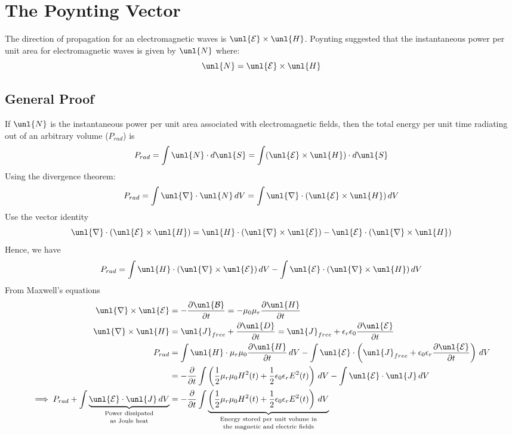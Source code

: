 \documentclass[a4paper, 11pt, normalem]{report}
\newcommand\p{\partial}
\newcommand\E{\mathcal{E}}
\newcommand\uE{\unl{\E}}
\newcommand\B{\mathcal{B}}
\newcommand\uB{\unl{\B}}
\newcommand\del{\unl{\nabla}}
\newcommand\eno{\epsilon_0}
\newcommand\J{\unl{J}}
\newcommand\er{\epsilon_r}
\begin{document}
\section{The Poynting Vector}
The direction of propagation for an electromagnetic waves is $\uE\times\unl{H}$.
Poynting suggested that the instantaneous power per unit area for electromagnetic waves is given by $\unl{N}$ where:
\begin{equation*}
	\unl{N} = \uE\times\unl{H}
\end{equation*}
\subsection{General Proof}
If $\unl{N}$ is the instantaneous power per unit area associated with electromagnetic fields, then the total energy per unit time radiating out of an arbitrary volume ($P_{rad}$) is
\begin{equation*}
	P_{rad} = \int \unl{N}\cdot d\unl{S} = \int (\uE\times\unl{H})\cdot d\unl{S}
\end{equation*}
Using the divergence theorem:
\begin{equation*}
	P_{rad} = \int \del\cdot\unl{N}\,dV = \int \del\cdot(\uE\times\unl{H})\,dV
\end{equation*}
Use the vector identity
\begin{equation*}
	\del\cdot(\uE\times\unl{H}) = \unl{H}\cdot(\del\times\uE) - \uE\cdot(\del\times\unl{H})
\end{equation*}
Hence, we have
\begin{equation*}
	P_{rad} = \int \unl{H}\cdot(\del\times\uE)\,dV - \int \uE\cdot(\del\times\unl{H})\,dV
\end{equation*}
From Maxwell's equations
\begin{align*}
	\del\times\uE &= -\frac{\p\uB}{\p t} = -\mu_0\mu_r\frac{\p\unl{H}}{\p t} \\
	\del\times\unl{H} &= \J_{free} + \frac{\p \unl{D}}{\p t} = \J_{free} + \er\eno\frac{\p\uE}{\p t} \\
	P_{rad} &= \int \unl{H}\cdot\mu_r\mu_0\frac{\p\unl{H}}{\p t}\,dV - \int \uE\cdot\left(\J_{free} + \eno\er\frac{\p\uE}{\p t}\right)\,dV \\
	&= -\frac{\p}{\p t}\int \left(\frac{1}{2}\mu_r\mu_0H^2(t) + \frac{1}{2}\eno\er E^2(t)\right)\,dV - \int \uE\cdot\J\,dV \\
	\implies P_{rad} + \int \underbrace{\uE\cdot\J\,dV}_{\text{\shortstack{Power dissipated \\ as Joule heat}}} &= -\frac{\p}{\p t}\int \underbrace{\left(\frac{1}{2}\mu_r\mu_0H^2(t) + \frac{1}{2}\eno\er E^2(t)\right)\,dV}_{\text{\shortstack{Energy stored per unit volume in \\ the magnetic and electric fields}}}
\end{align*}
\end{document}
